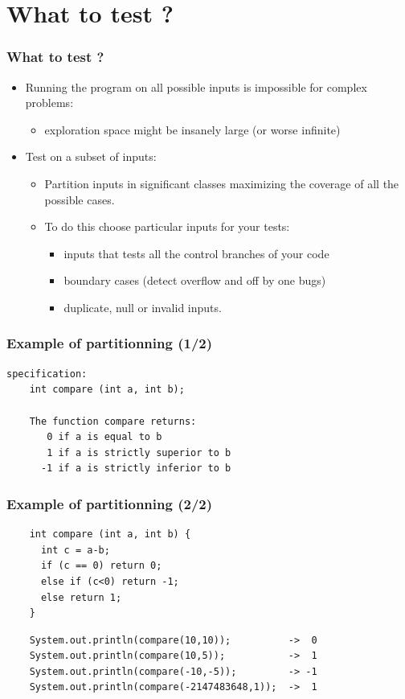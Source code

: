 \documentclass[10pt]{beamer}
\begin{document}
\section{What to test ?}
\begin{frame}
  \frametitle{What to test ?}
  \begin{itemize}
    \item Running the program on all possible inputs is impossible for complex
      problems:
      \begin{itemize}
      \item exploration space might be insanely large (or worse infinite)
      \end{itemize}
    \item Test on a subset of inputs:
      \begin{itemize}
      \item Partition inputs in significant classes maximizing the coverage of all the possible cases.
      \item To do this choose particular inputs for your tests:
        \begin{itemize}
          \item inputs that tests all the control branches of your code
          \item boundary cases (detect overflow and off by one bugs)
          \item duplicate, null or invalid inputs.
        \end{itemize}
      \end{itemize}
  \end{itemize}
\end{frame}

\begin{frame}[fragile]
  \frametitle{Example of partitionning (1/2)}
\begin{verbatim}
specification:
    int compare (int a, int b);

    The function compare returns:
       0 if a is equal to b
       1 if a is strictly superior to b
      -1 if a is strictly inferior to b
\end{verbatim}

\end{frame}

\begin{frame}[fragile]
  \frametitle{Example of partitionning (2/2)}
\begin{verbatim}
    int compare (int a, int b) {
      int c = a-b;
      if (c == 0) return 0;
      else if (c<0) return -1;
      else return 1;
    }
\end{verbatim}
\pause
\begin{verbatim}
    System.out.println(compare(10,10));          ->  0
    System.out.println(compare(10,5));           ->  1
    System.out.println(compare(-10,-5));         -> -1
    System.out.println(compare(-2147483648,1));  ->  1
\end{verbatim}
\end{frame}
\end{document}
